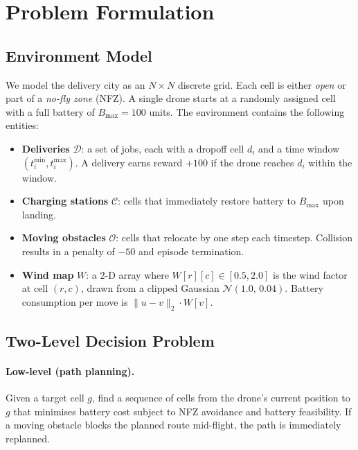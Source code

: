 \documentclass[11pt,twocolumn]{article}
\begin{document}
\section{Problem Formulation}
\label{sec:problem}

\subsection{Environment Model}

We model the delivery city as an $N \times N$ discrete grid.
Each cell is either \emph{open} or part of a \emph{no-fly zone} (NFZ).
A single drone starts at a randomly assigned cell with a full battery of
$B_{\max} = 100$ units.
The environment contains the following entities:

\begin{itemize}[leftmargin=*, nosep]
    \item \textbf{Deliveries} $\mathcal{D}$: a set of jobs, each with a
          dropoff cell $d_i$ and a time window $(t_i^{\min}, t_i^{\max})$.
          A delivery earns reward $+100$ if the drone reaches $d_i$
          within the window.
    \item \textbf{Charging stations} $\mathcal{C}$: cells that
          immediately restore battery to $B_{\max}$ upon landing.
    \item \textbf{Moving obstacles} $\mathcal{O}$: cells that relocate
          by one step each timestep.
          Collision results in a penalty of $-50$ and episode termination.
    \item \textbf{Wind map} $W$: a $2$-D array where $W[r][c] \in [0.5,
          2.0]$ is the wind factor at cell $(r,c)$, drawn from a clipped
          Gaussian $\mathcal{N}(1.0,\,0.04)$.
          Battery consumption per move is $\|u - v\|_2 \cdot W[v]$.
\end{itemize}

\subsection{Two-Level Decision Problem}

\paragraph{Low-level (path planning).}
Given a target cell $g$, find a sequence of cells from the drone's
current position to $g$ that minimises battery cost subject to NFZ
avoidance and battery feasibility.
If a moving obstacle blocks the planned route mid-flight, the path is
immediately replanned.
\end{document}
